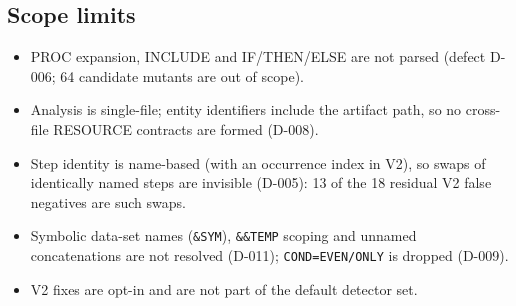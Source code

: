 \subsection{Scope limits}
\begin{itemize}
  \item PROC expansion, INCLUDE and IF/THEN/ELSE are not parsed
    (defect D-006; 64 candidate mutants are out of scope).
  \item Analysis is single-file; entity identifiers include the artifact path, so
    no cross-file RESOURCE contracts are formed (D-008).
  \item Step identity is name-based (with an occurrence index in V2), so swaps of
    identically named steps are invisible (D-005): 13 of the 18 residual V2 false
    negatives are such swaps.
  \item Symbolic data-set names (\texttt{\&SYM}), \texttt{\&\&TEMP} scoping and
    unnamed concatenations are not resolved (D-011); \texttt{COND=EVEN/ONLY} is
    dropped (D-009).
  \item V2 fixes are opt-in and are not part of the default detector set.
\end{itemize}
